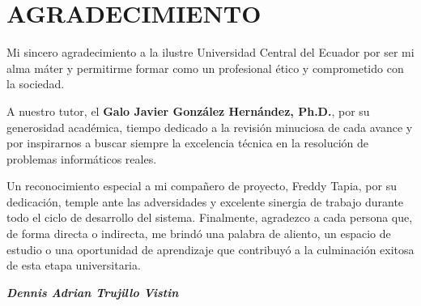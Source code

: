 
\pagestyle{empty}
\onehalfspacing
\fontsize{12}{18}\selectfont

\section*{AGRADECIMIENTO}

\vspace{1.5cm}

Mi sincero agradecimiento a la ilustre Universidad Central del Ecuador por ser mi alma máter y permitirme formar como un profesional ético y comprometido con la sociedad. 

A nuestro tutor, el \textbf{Galo Javier González Hernández, Ph.D.}, por su generosidad académica, tiempo dedicado a la revisión minuciosa de cada avance y por inspirarnos a buscar siempre la excelencia técnica en la resolución de problemas informáticos reales.

Un reconocimiento especial a mi compañero de proyecto, Freddy Tapia, por su dedicación, temple ante las adversidades y excelente sinergia de trabajo durante todo el ciclo de desarrollo del sistema. Finalmente, agradezco a cada persona que, de forma directa o indirecta, me brindó una palabra de aliento, un espacio de estudio o una oportunidad de aprendizaje que contribuyó a la culminación exitosa de esta etapa universitaria.

\vspace{2.5cm}

\begin{flushright}
\itshape
\textbf{Dennis Adrian Trujillo Vistin}
\end{flushright}

\newpage
